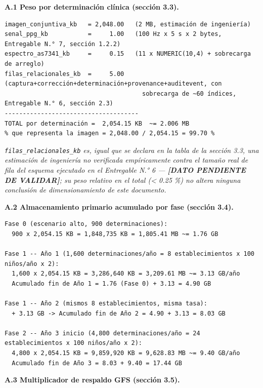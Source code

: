 \documentclass[11pt,a4paper]{article}
\begin{document}
\textbf{A.1 Peso por determinación clínica (sección 3.3).}

\begin{samepage}\begin{verbatim}
imagen_conjuntiva_kb   = 2,048.00   (2 MB, estimación de ingeniería)
senal_ppg_kb           =     1.00   (100 Hz x 5 s x 2 bytes, Entregable N.° 7, sección 1.2.2)
espectro_as7341_kb     =     0.15   (11 x NUMERIC(10,4) + sobrecarga de arreglo)
filas_relacionales_kb  =     5.00   (captura+corrección+determinación+provenance+auditevent, con
                                      sobrecarga de ~60 índices, Entregable N.° 6, sección 2.3)
-------------------------------------
TOTAL por determinación =  2,054.15 KB  ~= 2.006 MB
% que representa la imagen = 2,048.00 / 2,054.15 = 99.70 %
\end{verbatim}\end{samepage}

\emph{\texttt{filas\_relacionales\_kb} es, igual que se declara en la tabla de la sección 3.3, una estimación de ingeniería no verificada empíricamente contra el tamaño real de fila del esquema ejecutado en el Entregable N.° 6 --- \textbf{{[}DATO PENDIENTE DE VALIDAR{]}}; su peso relativo en el total (\textless{} 0.25 \%) no altera ninguna conclusión de dimensionamiento de este documento.}

\textbf{A.2 Almacenamiento primario acumulado por fase (sección 3.4).}

\begin{samepage}\begin{verbatim}
Fase 0 (escenario alto, 900 determinaciones):
  900 x 2,054.15 KB = 1,848,735 KB = 1,805.41 MB ~= 1.76 GB

Fase 1 -- Año 1 (1,600 determinaciones/año = 8 establecimientos x 100 niños/año x 2):
  1,600 x 2,054.15 KB = 3,286,640 KB = 3,209.61 MB ~= 3.13 GB/año
  Acumulado fin de Año 1 = 1.76 (Fase 0) + 3.13 = 4.90 GB

Fase 1 -- Año 2 (mismos 8 establecimientos, misma tasa):
  + 3.13 GB -> Acumulado fin de Año 2 = 4.90 + 3.13 = 8.03 GB

Fase 2 -- Año 3 inicio (4,800 determinaciones/año = 24 establecimientos x 100 niños/año x 2):
  4,800 x 2,054.15 KB = 9,859,920 KB = 9,628.83 MB ~= 9.40 GB/año
  Acumulado fin de Año 3 = 8.03 + 9.40 = 17.44 GB
\end{verbatim}\end{samepage}

\textbf{A.3 Multiplicador de respaldo GFS (sección 3.5).}
\end{document}
